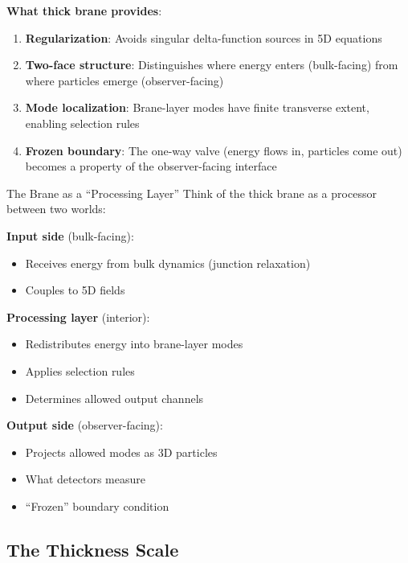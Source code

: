 \textbf{What thick brane provides}:

\begin{enumerate}[nosep]
\item \textbf{Regularization}: Avoids singular delta-function sources in 5D equations

\item \textbf{Two-face structure}: Distinguishes where energy enters (bulk-facing)
      from where particles emerge (observer-facing)

\item \textbf{Mode localization}: Brane-layer modes have finite transverse extent,
      enabling selection rules

\item \textbf{Frozen boundary}: The one-way valve (energy flows in, particles come out)
      becomes a property of the observer-facing interface
\end{enumerate}

\begin{mechanism}{The Brane as a ``Processing Layer''}
Think of the thick brane as a processor between two worlds:

\textbf{Input side} (bulk-facing):
\begin{itemize}[nosep]
\item Receives energy from bulk dynamics (junction relaxation)
\item Couples to 5D fields
\end{itemize}

\textbf{Processing layer} (interior):
\begin{itemize}[nosep]
\item Redistributes energy into brane-layer modes
\item Applies selection rules
\item Determines allowed output channels
\end{itemize}

\textbf{Output side} (observer-facing):
\begin{itemize}[nosep]
\item Projects allowed modes as 3D particles
\item What detectors measure
\item ``Frozen'' boundary condition
\end{itemize}
\end{mechanism}

\subsection{The Thickness Scale}

